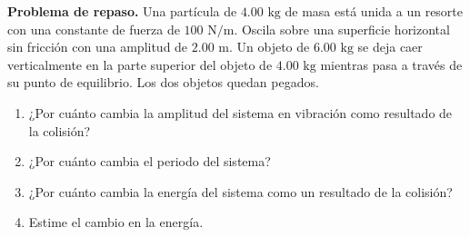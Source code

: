 \item \textbf{Problema de repaso.}
Una partícula de $4.00\text{ kg}$ de masa está unida a un resorte con una constante de fuerza de $100\text{ N/m}$. Oscila sobre una superficie horizontal sin fricción con una amplitud de $2.00\text{ m}$. Un objeto de $6.00\text{ kg}$ se deja caer verticalmente en la parte superior del objeto de $4.00\text{ kg}$ mientras pasa a través de su punto de equilibrio. Los dos objetos quedan pegados.
\begin{enumerate}
    \item ¿Por cuánto cambia la amplitud del sistema en vibración como resultado de la colisión?
    \item ¿Por cuánto cambia el periodo del sistema?
    \item ¿Por cuánto cambia la energía del sistema como un resultado de la colisión?
    \item Estime el cambio en la energía.
\end{enumerate}